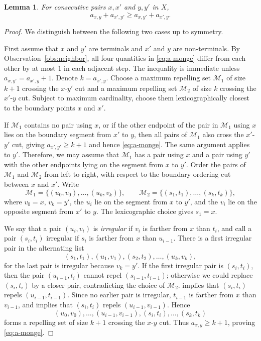 \documentclass[11pt]{article}
\newtheorem{lemma}[theorem]{Lemma}
\newcommand{\mset}{{\mathcal M}}
\begin{document}
\begin{lemma}\label{lem:a-monge}
For consecutive pairs $x,x'$ and $y,y'$ in $X$,
\begin{equation}\label{eq:a-monge}
   a_{x,y}+a_{x',y'}\ge a_{x,y'}+a_{x',y}.
\end{equation}
\end{lemma}

\begin{proof}
We distinguish between the following two cases up to symmetry.

First assume that $x$ and $y'$ are terminals and $x'$ and $y$ are non-terminals. By Observation~\ref{obs:neighbor}, all four quantities in \eqref{eq:a-monge} differ from each other by at most $1$ in each adjacent step. The inequality is immediate unless $a_{x,y'}=a_{x',y}+1$.
Denote $k=a_{x',y}$. Choose a maximum repelling set $\mset_1$ of size $k+1$ crossing the $x$-$y'$ cut and a maximum repelling set $\mset_2$ of size $k$ crossing the $x'$-$y$ cut.  Subject to maximum cardinality, choose them lexicographically closest to the boundary points $x$ and $x'$.

If $\mset_1$ contains no pair using $x$, or if the other endpoint of the pair in $\mset_1$ using $x$ lies on the boundary segment from $x'$ to $y$, then all pairs of $\mset_1$ also cross the $x'$-$y'$ cut, giving $a_{x',y'}\ge k+1$ and hence \eqref{eq:a-monge}.  The same argument applies to $y'$.  Therefore, we may assume that $\mset_1$ has a pair using $x$ and a pair using $y'$ with the other endpoints lying on the segment from $x$ to $y'$.
Order the pairs of $\mset_1$ and $\mset_2$ from left to right, with respect to the boundary ordering cut between $x$ and $x'$.  Write
\[
   \mset_1=\{(u_0,v_0),\ldots,(u_k,v_k)\},\qquad
   \mset_2=\{(s_1,t_1),\ldots,(s_k,t_k)\},
\]
where $v_0=x$, $v_k=y'$, the $u_i$ lie on the segment from $x$ to $y'$, and the $v_i$ lie on the opposite segment from $x'$ to $y$.  The lexicographic choice gives $s_1=x$.

We say that a pair $(u_i,v_i)$ is \emph{irregular} if $v_i$ is farther from $x$ than $t_i$, and call a pair $(s_i,t_i)$ irregular if $s_i$ is farther from $x$ than $u_{i-1}$.  There is a first irregular pair in the alternating list
\[
   (s_1,t_1),(u_1,v_1),(s_2,t_2),\ldots,(u_k,v_k),
\]
for the last pair is irregular because $v_k=y'$.  If the first irregular pair is $(s_i,t_i)$, then the pair $(u_{i-1},t_i)$ cannot repel $(s_{i-1},t_{i-1})$; otherwise we could replace $(s_i,t_i)$ by a closer pair, contradicting the choice of $\mset_2$.  implies that $(s_i,t_i)$ repels $(u_{i-1},t_{i-1})$.  Since no earlier pair is irregular, $t_{i-1}$ is farther from $x$ than $v_{i-1}$, and  implies that $(s_i,t_i)$ repels $(u_{i-1},v_{i-1})$.  Hence
\[
   (u_0,v_0),\ldots,(u_{i-1},v_{i-1}),(s_i,t_i),\ldots,(s_k,t_k)
\]
forms a repelling set of size $k+1$ crossing the $x$-$y$ cut.  Thus $a_{x,y}\ge k+1$, proving \eqref{eq:a-monge}.


\end{proof}
\end{document}
